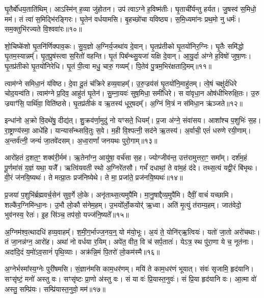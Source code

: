 घृ॒तैर्बो॑धय॒ताति॑थिम्।
आऽस्मि॑न् ह॒व्या जु॑होतन।
उप॑ त्वा\-ऽग्ने ह॒विष्म॑तीः।
घृ॒ताची᳚र्यन्तु हर्यत।
जु॒षस्व॑ स॒मिधो॒ मम॑।
तं त्वा॑ स॒मिद्भि॑रङ्गिरः।
घृ॒तेन॑ वर्धयामसि।
बृ॒हच्छो॑चा यविष्ठ्य।
स॒मि॒ध्यमा॑नः प्रथ॒मो नु धर्मः॑।
सम॒क्तुभि॑रज्यते वि॒श्ववा॑रः॥१०॥

शो॒चिष्के॑शो घृ॒तनि॑र्णिक्पाव॒कः।
सु॒य॒ज्ञो अ॒ग्निर्य॒जथा॑य दे॒वान्।
घृ॒तप्र॑तीको घृ॒तयो॑निर॒ग्निः।
घृ॒तैः समि॑द्धो घृ॒तम॒स्यान्नम्᳚।
घृ॒त॒प्रुष॑स्त्वा स॒रितो॑ वहन्ति।
घृ॒तं पिब᳚न्थ्सु॒यजा॑ यक्षि दे॒वान्।
आ॒यु॒र्दा अ॑ग्ने ह॒विषो॑ जुषा॒णः।
घृ॒तप्र॑तीको घृ॒तयो॑निरेधि।
घृ॒तं पी॒त्वा मधु॒ चारु॒ गव्यम्᳚।
पि॒तेव॑ पु॒त्रम॒भिर॑क्षतादि॒मम्॥११॥

{\small \closesub{}}

त्वाम॑ग्ने समिधा॒नं य॑विष्ठ।
दे॒वा दू॒तं च॑क्रिरे हव्य॒वाहम्᳚।
उ॒रु॒ज्रय॑सं घृ॒तयो॑नि॒माहु॑तम्।
त्वे॒षं चक्षु॑र्दधिरे चोद॒यन्व॑ति।
त्वाम॑ग्ने प्र॒दिव॒ आहु॑तं घृ॒तेन॑।
सु॒म्ना॒यवः॑ सुष॒मिधा॒ समी॑धिरे।
स वा॑वृधा॒न ओष॑धीभिरुक्षि॒तः।
उ॒रु ज्रयाꣳ॑सि॒ पार्थि॑वा॒ विति॑ष्ठसे।
घृ॒तप्र॑तीकं व ऋ॒तस्य॑ धूर्॒षदम्᳚।
अ॒ग्निं मि॒त्रं न स॑मिधा॒न ऋ॑ञ्जते॥१२॥

इन्धा॑नो अ॒क्रो वि॒दथे॑षु॒ दीद्य॑त्।
शु॒क्रव॑र्णा॒मुदु॑ नो यꣳसते॒ धियम्᳚।
प्र॒जा अ॑ग्ने॒ संवा॑सय।
आशा᳚श्च प॒शुभिः॑ स॒ह।
रा॒ष्ट्राण्य॑स्मा॒ आधे॑हि।
यान्यास᳚न्थ्सवि॒तुः स॒वे।
म॒ही वि॒श्पत्नी॒ सद॑ने ऋ॒तस्य॑।
अ॒र्वाची॒ एतं॑ धरुणे रयी॒णाम्।
अ॒न्तर्व॑त्नी॒ जन्यं॑ जा॒तवे॑दसम्।
अ॒ध्व॒राणां᳚ जनयथः पुरो॒गाम्॥१३॥

आरो॑हतं द॒शत॒ꣳ॒ शक्व॑री॒र्मम॑।
ऋ॒तेना᳚ग्न॒ आयु॑षा॒ वर्च॑सा स॒ह।
ज्योग्जीव॑न्त॒ उत्त॑रामुत्तरा॒ꣳ॒ समा᳚म्।
दर्\mbox{}श॑म॒हं पू॒र्णमा॑सं य॒ज्ञं यथा॒ यजै᳚।
ऋत्वि॑यवती स्थो अ॒ग्निरे॑तसौ।
गर्भं॑ दधाथां॒ ते वा॑म॒हं द॑दे।
तथ्स॒त्यं यद्वी॒रं बि॑भृथः।
वी॒रं ज॑नयि॒ष्यथः॑।
ते मत्प्रा॒तः प्रज॑निष्येथे।
ते मा॒ प्रजा॑ते॒ प्रज॑नयि॒ष्यथः॑॥१४॥

प्र॒जया॑ प॒शुभि॑र्ब्रह्मवर्च॒सेन॑ सुव॒र्गे लो॒के।
अनृ॑ताथ्स॒त्य\-मुपै॑मि।
मा॒नु॒षाद्दैव्य॒मुपै॑मि।
दैवीं॒ वाचं॑ यच्छामि।
शल्कै॑र॒ग्निमि॑न्धा॒नः।
उ॒भौ लो॒कौ स॑नेम॒हम्।
उ॒भयो᳚र्लो॒कयोर्॑ ऋ॒ध्वा।
अति॑ मृ॒त्युं त॑राम्य॒हम्।
जात॑वेदो॒ भुव॑नस्य॒ रेतः॑।
इ॒ह सि॑ञ्च॒ तप॑सो॒ यज्ज॑नि॒ष्यते᳚॥१५॥

अ॒ग्निम॑श्व॒त्थादधि॑ हव्य॒वाहम्᳚।
श॒मी॒ग॒र्भाज्ज॒नय॒न्॒ यो म॑यो॒भूः।
अ॒यं ते॒ योनि॑र्‌\mbox{}ऋ॒त्वियः॑।
यतो॑ जा॒तो अरो॑चथाः।
तं जा॒नन्न॑ग्न॒ आरो॑ह।
अथा॑ नो वर्धया र॒यिम्।
अपे॑त॒ वीत॒ वि च॑ सर्प॒तातः॑।
येऽत्र॒ स्थ पु॑रा॒णा ये च॒ नूत॑नाः।
अदा॑दि॒दं य॒मो॑\-ऽव॒सानं॑ पृथि॒व्याः।
अक्र॑न्नि॒मं पि॒तरो॑ लो॒कम॑स्मै॥१६॥

अ॒ग्नेर्भस्मा᳚स्य॒ग्नेः पुरी॑षमसि।
सं॒ज्ञान॑मसि काम॒धर॑णम्।
मयि॑ ते काम॒धर॑णं भूयात्।
संवः॑ सृजामि॒ हृद॑यानि।
सꣳसृ॑ष्टं॒ मनो॑ अस्तु वः।
सꣳसृ॑ष्टः प्रा॒णो अ॑स्तु वः।
सं या वः॑ प्रि॒यास्त॒नुवः॑।
सं प्रि॒या हृद॑यानि वः।
आ॒त्मा वो॑ अस्तु॒ सम्प्रि॑यः।
सम्प्रि॑यास्त॒नुवो॒ मम॑॥१७॥

